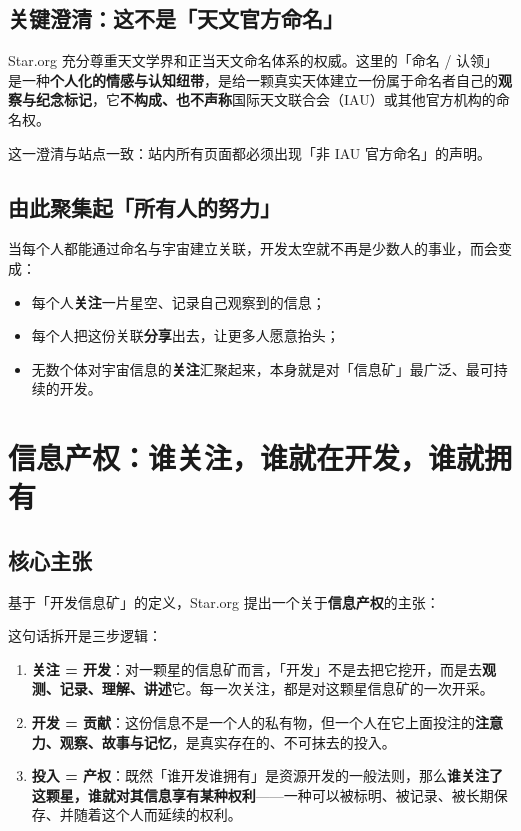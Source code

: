 \documentclass[11pt,fontset=none]{ctexart}
\begin{document}
\subsection{关键澄清：这不是「天文官方命名」}

Star.org 充分尊重天文学界和正当天文命名体系的权威。这里的「命名 / 认领」是一种\textbf{个人化的情感与认知纽带}，是给一颗真实天体建立一份属于命名者自己的\textbf{观察与纪念标记}，它\textbf{不构成、也不声称}国际天文联合会（IAU）或其他官方机构的命名权。

这一澄清与站点一致：站内所有页面都必须出现「非 IAU 官方命名」的声明。

\subsection{由此聚集起「所有人的努力」}

当每个人都能通过命名与宇宙建立关联，开发太空就不再是少数人的事业，而会变成：

\begin{itemize}
  \item 每个人\textbf{关注}一片星空、记录自己观察到的信息；
  \item 每个人把这份关联\textbf{分享}出去，让更多人愿意抬头；
  \item 无数个体对宇宙信息的\textbf{关注}汇聚起来，本身就是对「信息矿」最广泛、最可持续的开发。
\end{itemize}


\section{信息产权：谁关注，谁就在开发，谁就拥有}

\subsection{核心主张}

基于「开发信息矿」的定义，Star.org 提出一个关于\textbf{信息产权}的主张：


这句话拆开是三步逻辑：

\begin{enumerate}
  \item \textbf{关注 = 开发}：对一颗星的信息矿而言，「开发」不是去把它挖开，而是去\textbf{观测、记录、理解、讲述}它。每一次关注，都是对这颗星信息矿的一次开采。
  \item \textbf{开发 = 贡献}：这份信息不是一个人的私有物，但一个人在它上面投注的\textbf{注意力、观察、故事与记忆}，是真实存在的、不可抹去的投入。
  \item \textbf{投入 = 产权}：既然「谁开发谁拥有」是资源开发的一般法则，那么\textbf{谁关注了这颗星，谁就对其信息享有某种权利}——一种可以被标明、被记录、被长期保存、并随着这个人而延续的权利。
\end{enumerate}
\end{document}
